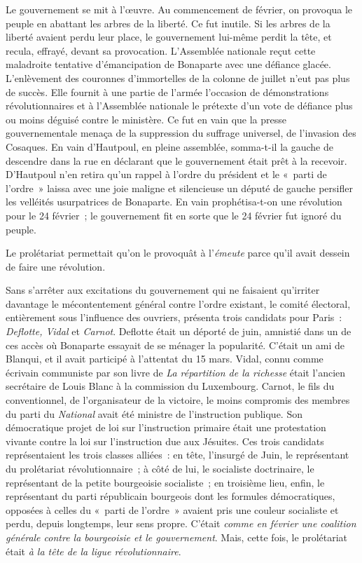 \documentclass[french,twoside]{book} %
\begin{document}
Le gouvernement se mit à l’œuvre. Au commencement de février, on provoqua le peuple en abattant les arbres de la liberté. Ce fut inutile. Si les arbres de la liberté avaient perdu leur place, le gouvernement lui-même perdit la tête, et recula, effrayé, devant sa provocation. L’Assemblée nationale reçut cette maladroite tentative d’émancipation de Bonaparte avec une défiance glacée. L’enlèvement des couronnes d’immortelles de la colonne de juillet n’eut pas plus de succès. Elle fournit à une partie de l’armée l’occasion de démonstrations révolutionnaires et à l’Assemblée nationale le prétexte d’un vote de défiance plus ou moins déguisé contre le ministère. Ce fut en vain que la presse gouvernementale menaça de la suppression du suffrage universel, de l’invasion des Cosaques. En vain d’Hautpoul, en pleine assemblée, somma-t-il la gauche de descendre dans la rue en déclarant que le gouvernement était prêt à la recevoir. D’Hautpoul n’en retira qu’un rappel à l’ordre du président et le « parti de l’ordre » laissa avec une joie maligne et silencieuse un député de gauche persifler les velléités usurpatrices de Bonaparte. En vain prophétisa-t-on une révolution pour le 24 février ; le gouvernement fit en sorte que le 24 février fut ignoré du peuple.\par
Le prolétariat permettait qu’on le provoquât à l’\emph{émeute} parce qu’il avait dessein de faire une révolution.\par
Sans s’arrêter aux excitations du gouvernement qui ne faisaient qu’irriter davantage le mécontentement général contre l’ordre existant, le comité électoral, entièrement sous l’influence des ouvriers, présenta trois candidats pour Paris : \emph{Deflotte, Vidal} et \emph{Carnot}. Deflotte était un déporté de juin, amnistié dans un de ces accès où Bonaparte essayait de se ménager la popularité. C’était un ami de Blanqui, et il avait participé à l’attentat du 15 mars. Vidal, connu comme écrivain communiste par son livre de \emph{La répartition de la richesse} était l’ancien secrétaire de Louis Blanc à la commission du Luxembourg. Carnot, le fils du conventionnel, de l’organisateur de la victoire, le moins compromis des membres du parti du \emph{National} avait été ministre de l’instruction publique. Son démocratique projet de loi sur l’instruction primaire était une protestation vivante contre la loi sur l’instruction due aux Jésuites. Ces trois candidats représentaient les trois classes alliées : en tête, l’insurgé de Juin, le représentant du prolétariat révolutionnaire ; à côté de lui, le socialiste doctrinaire, le représentant de la petite bourgeoisie socialiste ; en troisième lieu, enfin, le représentant du parti républicain bourgeois dont les formules démocratiques, opposées à celles du « parti de l’ordre » avaient pris une couleur socialiste et perdu, depuis longtemps, leur sens propre. C’était \emph{comme en février une coalition générale contre la bourgeoisie et le gouvernement}. Mais, cette fois, le prolétariat était \emph{à la tête de la ligue révolutionnaire}.\par
\end{document}
